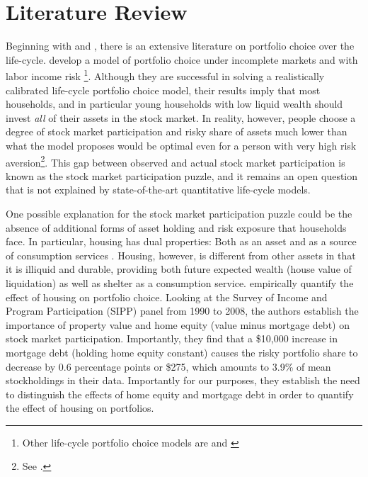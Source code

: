 
  \section{Literature Review}

  Beginning with \cite{Merton1969} and \cite{Samuelson1969}, there is an extensive literature on portfolio choice over the life-cycle. \cite{Cocco2005} develop a model of portfolio choice under incomplete markets and with labor income risk \footnote{Other life-cycle portfolio choice models are \cite{gomes2005optimal} and \cite{yao2005optimal}}. Although they are successful in solving a realistically calibrated life-cycle portfolio choice model, their results imply that most households, and in particular young households with low liquid wealth should invest \textit{all} of their assets in the stock market. In reality, however, people choose a degree of stock market participation and risky share of assets much lower than what the model proposes would be optimal even for a person with very high risk aversion\footnote{See \cite{Carroll2020}.}. This gap between observed and actual stock market participation is known as the stock market participation puzzle, and it remains an open question that is not explained by state-of-the-art quantitative life-cycle models.

  One possible explanation for the stock market participation puzzle could be the absence of additional forms of asset holding and risk exposure that households face. In particular, housing has dual properties: Both as an asset and as a source of consumption services . Housing, however, is different from other assets in that it is illiquid and durable, providing both future expected wealth (house value of liquidation) as well as shelter as a consumption service. \cite{Chetty2017} empirically quantify the effect of housing on portfolio choice. Looking at the Survey of Income and Program Participation (SIPP) panel from 1990 to 2008, the authors establish the importance of property value and home equity (value minus mortgage debt) on stock market participation. Importantly, they find that a \$10,000 increase in mortgage debt (holding home equity constant) causes the risky portfolio share to decrease by 0.6 percentage points or \$275, which amounts to 3.9\% of mean stockholdings in their data. Importantly for our purposes, they establish the need to distinguish the effects of home equity and mortgage debt in order to quantify the effect of housing on portfolios.

